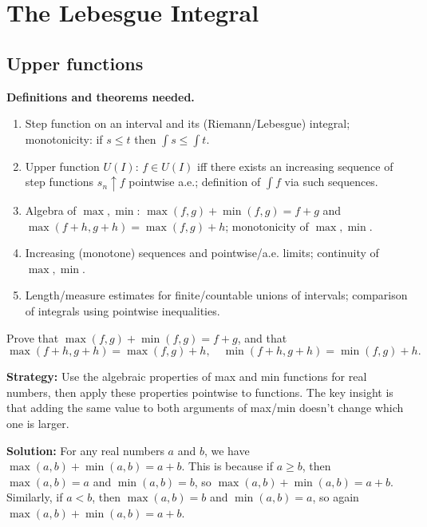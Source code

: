 \chapter{The Lebesgue Integral}

\section{Upper functions}

\noindent\textbf{Definitions and theorems needed.}
\begin{enumerate}[label=(\alph*)]
\item Step function on an interval and its (Riemann/Lebesgue) integral; monotonicity: if $s\le t$ then $\int s\le\int t$.
\item Upper function $U(I)$: $f\in U(I)$ iff there exists an increasing sequence of step functions $s_n\uparrow f$ pointwise a.e.; definition of $\int f$ via such sequences.
\item Algebra of $\max,\min$: $\max(f,g)+\min(f,g)=f+g$ and $\max(f+h,g+h)=\max(f,g)+h$; monotonicity of $\max,\min$.
\item Increasing (monotone) sequences and pointwise/a.e. limits; continuity of $\max,\min$.
\item Length/measure estimates for finite/countable unions of intervals; comparison of integrals using pointwise inequalities.
\end{enumerate}



\begin{problembox}
\begin{problemstatement}
Prove that $\max(f, g) + \min(f, g) = f + g$, and that 
\[ \max(f + h, g + h) = \max(f, g) + h, \quad \min(f + h, g + h) = \min(f, g) + h. \]
\end{problemstatement}
\end{problembox}

\noindent\textbf{Strategy:} Use the algebraic properties of max and min functions for real numbers, then apply these properties pointwise to functions. The key insight is that adding the same value to both arguments of max/min doesn't change which one is larger.

\bigskip\noindent\textbf{Solution:}
For any real numbers $a$ and $b$, we have $\max(a, b) + \min(a, b) = a + b$. This is because if $a \geq b$, then $\max(a, b) = a$ and $\min(a, b) = b$, so $\max(a, b) + \min(a, b) = a + b$. Similarly, if $a < b$, then $\max(a, b) = b$ and $\min(a, b) = a$, so again $\max(a, b) + \min(a, b) = a + b$.


